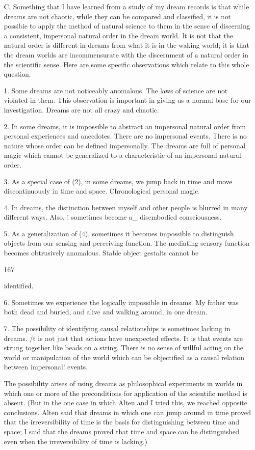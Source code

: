 \documentclass[10pt,twoside]{memoir}
\begin{document}
\begin{enumerate}
{{C. Something that I have learned from a study of my dream records is 
that while dreams are not chaotic, while they can be compared and 
classified, it is not possibie to apply the method of natural science to them in 
the sense of discerning a consistent, impersonal natural order in the dream 
world. It is not that the natural order is different in dreams from what it is in 
the waking world; it is that the dream worlds are incommensurate with the 
discernment of a natural order in the scientific sense. Here are some specific 
observations which relate to this whole question. 

1. Some dreams are not noticeably anomalous. The laws of science are not 
violated in them. This observation is important in giving us a normal base for 
our investigation. Dreams are not all crazy and chaotic. 

2. In some dreams, it is impossible to abstract an impersonal natural order 
from personal experiences and anecdotes. There are no impersonal events. 
There is no nature whose order can be defined impersonally. The dreams are 
full of personal magic which cannot be generalized to a characteristic of an 
impersonal natural order. 

3. As a special case of (2), in some dreams, we jump back in time and move 
discontinuously in time and space. Chronological personal magic. 

4. In dreams, the distinction between myself and other people is blurred in 
many different ways. Also, ! sometimes become a_ disembodied 
consciousness. 

5. As a generalization of (4), sometimes it becomes impossible to distinguish 
objects from our sensing and perceiving function. The mediating sensory 
function becomes obtrusively anomalous. Stable object gestalts cannot be 


167 


identified. 

6. Sometimes we experience the logically impossible in dreams. My father 
was both dead and buried, and alive and walking around, in one dream. 

7. The possibility of identifying causal relationships is sometimes lacking in 
dreams. /t is not just that actions have unexpected effects. It is that events 
are strung together like beads on a string. There is no sense of willful acting 
on the world or manipulation of the world which can be objectified as a 
causal relation between impersonal! events. 

The possibility arises of using dreams as philosophical experiments in 
worlds in which one or more of the preconditions for application of the 
scientific method is absent. (But in the one case in which Alten and I tried 
this, we reached opposite conclusions. Alten said that dreams in which one 
can jump around in time proved that the irreversibility of time is the basis 
for distinguishing between time and space; I said that the dreams proved that 
time and space can be distinguished even when the irreversibility of time is 
lacking.) 

}}
\end{enumerate}
\end{document}
